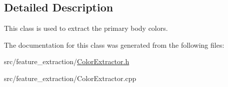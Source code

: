 \subsection{Detailed Description}
This class is used to extract the primary body colors. 

The documentation for this class was generated from the following files\+:\begin{DoxyCompactItemize}
\item 
src/feature\+\_\+extraction/\mbox{\hyperlink{_color_extractor_8h}{Color\+Extractor.\+h}}\item 
src/feature\+\_\+extraction/Color\+Extractor.\+cpp\end{DoxyCompactItemize}
